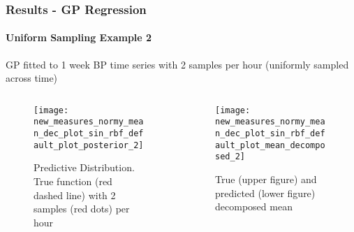 \documentclass[
	8pt, %
]{beamer}
\begin{document}
\begin{frame}
	\frametitle{Results - GP Regression}
	\framesubtitle{Uniform Sampling Example 2}

	GP fitted to 1 week BP time series with 2 samples per hour (uniformly sampled across time)

	\begin{columns}[c] %
		\begin{column}{0.5\textwidth} %
				\begin{figure}
					\texttt{[image: new\_measures\_normy\_mean\_dec\_plot\_sin\_rbf\_default\_plot\_posterior\_2]}
					\caption{Predictive Distribution. True function (red dashed line) with 2 samples (red dots) per hour}
				\end{figure}
		\end{column}
		\begin{column}{0.5\textwidth} %
				\begin{figure}
					\texttt{[image: new\_measures\_normy\_mean\_dec\_plot\_sin\_rbf\_default\_plot\_mean\_decomposed\_2]}
					\caption{True (upper figure) and predicted (lower figure) decomposed mean}
				\end{figure}

		\end{column}
	\end{columns}

\end{frame}
\end{document}
